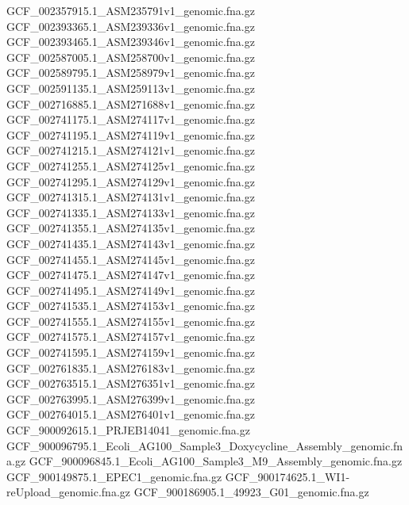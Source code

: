 \documentclass[12pt, letterpaper]{article}
\begin{document}
\begin{verbatim*}
GCF_002357915.1_ASM235791v1_genomic.fna.gz
GCF_002393365.1_ASM239336v1_genomic.fna.gz
GCF_002393465.1_ASM239346v1_genomic.fna.gz
GCF_002587005.1_ASM258700v1_genomic.fna.gz
GCF_002589795.1_ASM258979v1_genomic.fna.gz
GCF_002591135.1_ASM259113v1_genomic.fna.gz
GCF_002716885.1_ASM271688v1_genomic.fna.gz
GCF_002741175.1_ASM274117v1_genomic.fna.gz
GCF_002741195.1_ASM274119v1_genomic.fna.gz
GCF_002741215.1_ASM274121v1_genomic.fna.gz
GCF_002741255.1_ASM274125v1_genomic.fna.gz
GCF_002741295.1_ASM274129v1_genomic.fna.gz
GCF_002741315.1_ASM274131v1_genomic.fna.gz
GCF_002741335.1_ASM274133v1_genomic.fna.gz
GCF_002741355.1_ASM274135v1_genomic.fna.gz
GCF_002741435.1_ASM274143v1_genomic.fna.gz
GCF_002741455.1_ASM274145v1_genomic.fna.gz
GCF_002741475.1_ASM274147v1_genomic.fna.gz
GCF_002741495.1_ASM274149v1_genomic.fna.gz
GCF_002741535.1_ASM274153v1_genomic.fna.gz
GCF_002741555.1_ASM274155v1_genomic.fna.gz
GCF_002741575.1_ASM274157v1_genomic.fna.gz
GCF_002741595.1_ASM274159v1_genomic.fna.gz
GCF_002761835.1_ASM276183v1_genomic.fna.gz
GCF_002763515.1_ASM276351v1_genomic.fna.gz
GCF_002763995.1_ASM276399v1_genomic.fna.gz
GCF_002764015.1_ASM276401v1_genomic.fna.gz
GCF_900092615.1_PRJEB14041_genomic.fna.gz
GCF_900096795.1_Ecoli_AG100_Sample3_Doxycycline_Assembly_genomic.fna.gz
GCF_900096845.1_Ecoli_AG100_Sample3_M9_Assembly_genomic.fna.gz
GCF_900149875.1_EPEC1_genomic.fna.gz
GCF_900174625.1_WI1-reUpload_genomic.fna.gz
GCF_900186905.1_49923_G01_genomic.fna.gz
\end{verbatim*}
\end{document}
